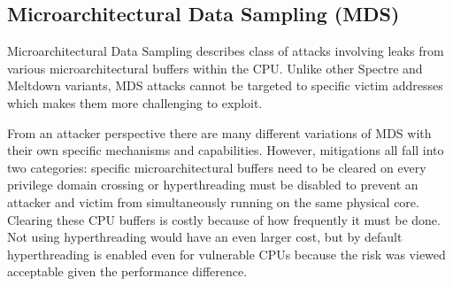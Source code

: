 \subsection{Microarchitectural Data Sampling (MDS)}
Microarchitectural Data Sampling describes class of attacks involving leaks from various microarchitectural buffers within the CPU.
Unlike other Spectre and Meltdown variants, MDS attacks cannot be targeted to specific victim addresses which makes them more challenging to exploit.

From an attacker perspective there are many different variations of MDS with their own specific mechanisms and capabilities.
However, mitigations all fall into two categories: specific microarchitectural buffers need to be cleared on every privilege domain crossing or hyperthreading must be disabled to prevent an attacker and victim from simultaneously running on the same physical core.
Clearing these CPU buffers is costly because of how frequently it must be done.
Not using hyperthreading would have an even larger cost, but by default
hyperthreading is enabled even for vulnerable CPUs because the risk was viewed acceptable given the performance difference.



